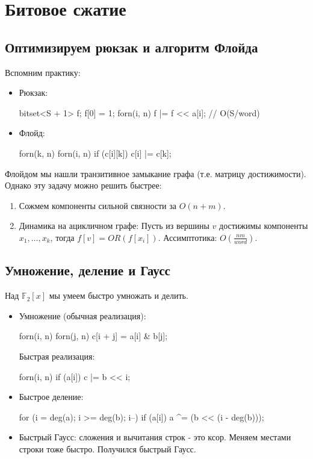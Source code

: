 \section{Битовое сжатие}

\subsection{Оптимизируем рюкзак и алгоритм Флойда}
Вспомним практику:
\begin{itemize}
  \item Рюкзак:
\begin{cppcode}
bitset<S + 1> f;
f[0] = 1;
forn(i, n) 
  f |= f << a[i]; // O(S/word)
\end{cppcode}
  \item Флойд:
\begin{cppcode}
forn(k, n) {
  forn(i, n) {
    if (c[i][k])
      c[i] |= c[k];
  }
}
\end{cppcode}
\end{itemize}

Флойдом мы нашли транзитивное замыкание графа (т.е. матрицу достижимости). Однако эту задачу можно решить быстрее:
\begin{enumerate}
  \item Сожмем компоненты сильной связности за $O(n + m)$.
  \item Динамика на ацикличном графе: Пусть из вершины $v$ достижимы компоненты $x_1, \dots, x_k$, тогда $f[v] = OR(f[x_i])$. Ассимптотика: $O(\frac{nm}{word})$.
\end{enumerate}

\subsection{Умножение, деление и Гаусс}
Над $\mathbb{F}_2[x]$ мы умеем быстро умножать и делить.
\begin{itemize}
  \item Умножение (обычная реализация):
\begin{cppcode}
forn(i, n) {
  forn(j, n)
    c[i + j] = a[i] & b[j];
}
\end{cppcode}
    Быстрая реализация:
\begin{cppcode}
forn(i, n) {
  if (a[i])
    c |= b << i;
}
\end{cppcode}
  \item Быстрое деление:
\begin{cppcode}
for (i = deg(a); i >= deg(b); i--)
  if (a[i])
    a ^= (b << (i - deg(b)));
\end{cppcode}
  \item Быстрый Гаусс: сложения и вычитания строк - это ксор. Меняем местами строки тоже быстро. Получился быстрый Гаусс.
\end{itemize}


